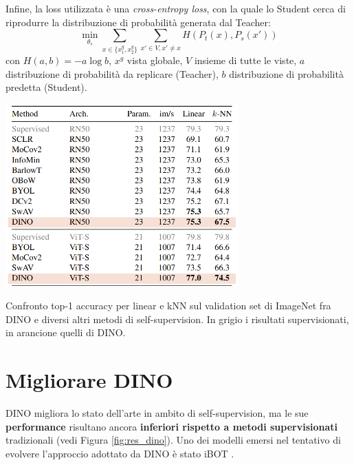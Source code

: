 Infine, la loss utilizzata è una \textit{cross-entropy loss}, con la quale lo Student cerca di riprodurre la distribuzione di probabilità generata dal Teacher:
\begin{equation}
\underset{\theta_s}{\min} \sum_{x \in \{x_1^g, x_2^g\}}\sum_{x' \in V, x' \ne x} H(P_t(x), P_s(x'))
\end{equation}
con \(H(a, b) = -a \log b\), \(x^g\) vista globale, \(V\) insieme di tutte le viste, \(a\) distribuzione di probabilità da replicare (Teacher), \(b\) distribuzione di probabilità predetta (Student).

\begin{table}[t]
    \centering
    \includegraphics[height=70mm]{Immagini/ssl/res_dino.png}
    \caption{Confronto top-1 accuracy per linear e kNN sul validation set di ImageNet fra DINO e diversi altri metodi di self-supervision. In grigio i risultati supervisionati, in arancione quelli di DINO.}
    \label{fig:res_dino}
\end{table}

\section{Migliorare DINO}
DINO migliora lo stato dell'arte in ambito di self-supervision, ma le sue \textbf{performance} risultano ancora \textbf{inferiori rispetto a metodi supervisionati} tradizionali (vedi Figura \ref{fig:res_dino}). Uno dei modelli emersi nel tentativo di evolvere l'approccio adottato da DINO è stato iBOT \cite{ibot}.

